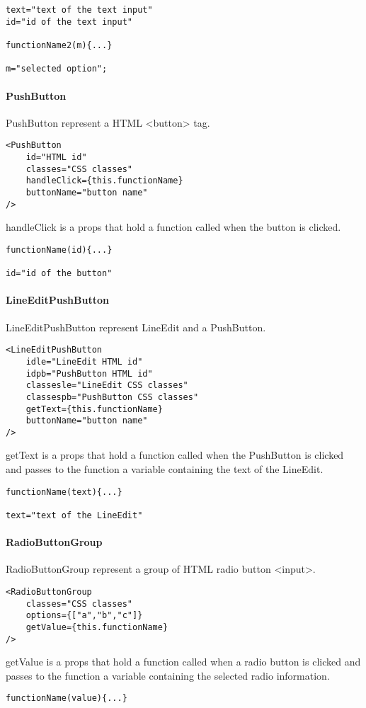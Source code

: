 \begin{flushleft}
\begin{verbatim}
text="text of the text input"
id="id of the text input"

functionName2(m){...}

m="selected option";
\end{verbatim}
    \paragraph{PushButton}
PushButton represent a HTML <button> tag.
\begin{verbatim}
<PushButton
    id="HTML id"
    classes="CSS classes"
    handleClick={this.functionName}
    buttonName="button name"
/>
\end{verbatim}
handleClick is a props that hold a function called when the button is clicked.
\begin{verbatim}
functionName(id){...}

id="id of the button"
\end{verbatim}

    \paragraph{LineEditPushButton}
LineEditPushButton represent LineEdit and a PushButton.
\begin{verbatim}
<LineEditPushButton
    idle="LineEdit HTML id"
    idpb="PushButton HTML id"
    classesle="LineEdit CSS classes"
    classespb="PushButton CSS classes"
    getText={this.functionName}
    buttonName="button name"
/>
\end{verbatim}
getText is a props that hold a function called when the PushButton is clicked and passes to the function a variable containing the text of the LineEdit.
\begin{verbatim}
functionName(text){...}

text="text of the LineEdit"
\end{verbatim}

    \paragraph{RadioButtonGroup}
RadioButtonGroup represent a group of HTML radio button <input>.
\begin{verbatim}
<RadioButtonGroup
    classes="CSS classes"
    options={["a","b","c"]}
    getValue={this.functionName}
/>
\end{verbatim}
getValue is a props that hold a function called when a radio button is clicked and passes to the function a variable containing the selected radio information.
\begin{verbatim}
functionName(value){...}


\end{verbatim}
\end{flushleft}
